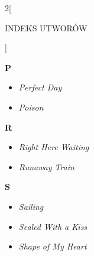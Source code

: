 \documentclass[a4paper]{report}
\begin{document}
\begin{multicols*}{2}[\begin{Huge}INDEKS UTWORÓW\end{Huge}\vspace{1cm}]
\begin{minipage}{\columnwidth}
\begin{itemize}[topsep=6pt, after=\vspace{5mm}, leftmargin=0mm]
	\end{itemize}
\end{minipage}
\begin{minipage}{\columnwidth}
\begin{Large}
		\textbf{P}
	\end{Large} 
	\begin{itemize}[topsep=6pt, after=\vspace{5mm}, leftmargin=0mm]
		\itemsep0em
		\item[]\textit{Perfect Day}  \\
		\item[]  \textit{Poison}  \\
	\end{itemize}
\end{minipage}
\begin{minipage}{\columnwidth}
\begin{Large}
		\textbf{R}
	\end{Large} 
	\begin{itemize}[topsep=6pt, after=\vspace{5mm}, leftmargin=0mm]
		\itemsep0em
		\item[]\textit{Right Here Waiting}  \\
		\item[]  \textit{Runaway Train}  \\
	\end{itemize}
\end{minipage}
\begin{minipage}{\columnwidth}
\begin{Large}
		\textbf{S}
	\end{Large} 
	\begin{itemize}[topsep=6pt, after=\vspace{1.5mm}, leftmargin=0mm]
		\itemsep0em
		\item[]\textit{Sailing}  \\
		\item[]  \textit{Sealed With a Kiss}  \\
	\end{itemize}
\end{minipage}
\begin{minipage}{\columnwidth}
	\begin{itemize}[topsep=6pt, after=\vspace{1.5mm}, leftmargin=0mm]
		\itemsep0em
		\item[]  \textit{Shape of My Heart}  \\

\end{itemize}
\end{minipage}
\end{multicols*}
\end{document}
